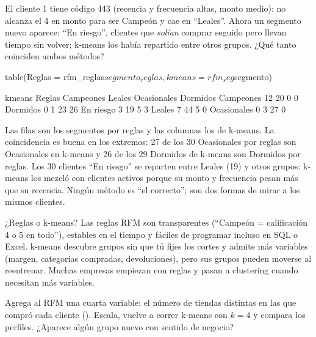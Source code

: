 El cliente 1 tiene código 443 (recencia y frecuencia altas, monto medio): no
alcanza el 4 en monto para ser Campeón y cae en ``Leales''. Ahora un segmento nuevo aparece: ``En riesgo'', clientes que
\emph{solían} comprar seguido pero llevan tiempo sin volver; k-means los había
repartido entre otros grupos. ¿Qué tanto coinciden ambos métodos?

\begin{rcode}
table(Reglas = rfm_reglas$segmento_reglas, kmeans = rfm_seg$segmento)
\end{rcode}

\begin{rsalida}
             kmeans
Reglas        Campeones Leales Ocasionales Dormidos
  Campeones          12     20           0        0
  Dormidos            0      1          23       26
  En riesgo           3     19           5        3
  Leales              7     44           5        0
  Ocasionales         0      3          27        0
\end{rsalida}

Las filas son los segmentos por reglas y las columnas los de k-means. La
coincidencia es buena en los extremos: 27 de los 30 Ocasionales por reglas son
Ocasionales en k-means y 26 de los 29 Dormidos de k-means son Dormidos por
reglas. Los 30 clientes ``En riesgo'' se reparten entre Leales (19) y otros
grupos: k-means los mezcló con clientes activos porque su monto y frecuencia
pesan más que su recencia. Ningún método es ``el correcto''; son dos formas de
mirar a los mismos clientes.

\begin{negocio}{¿Reglas o k-means?}
Las reglas RFM son transparentes (``Campeón = calificación 4 o 5 en todo''),
estables en el tiempo y fáciles de programar incluso en SQL o Excel. k-means
descubre grupos sin que tú fijes los cortes y admite más variables (margen,
categorías compradas, devoluciones), pero sus grupos pueden moverse al
reentrenar. Muchas empresas empiezan con reglas y pasan a clustering cuando
necesitan más variables.
\end{negocio}

\begin{hazlotu}
Agrega al RFM una cuarta variable: el número de tiendas distintas en las que
compró cada cliente (). Escala, vuelve a correr
k-means con $k = 4$ y compara los perfiles. ¿Aparece algún grupo nuevo con
sentido de negocio?
\end{hazlotu}


